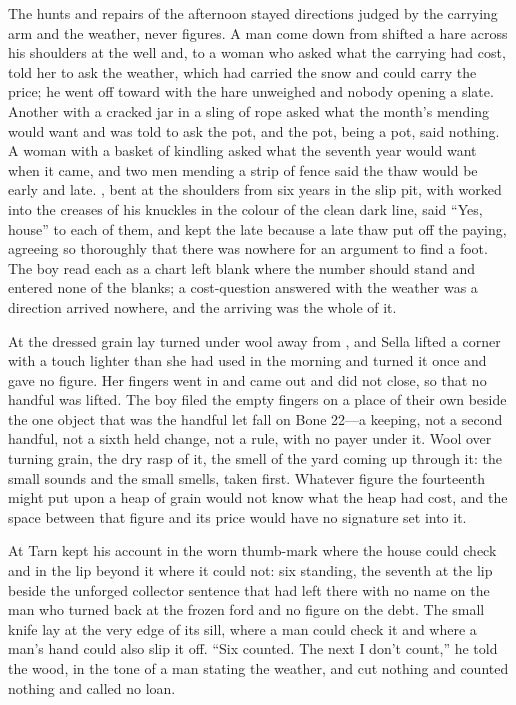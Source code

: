 The hunts and repairs of the afternoon stayed directions judged by the carrying arm and the weather, never figures. A man come down from  shifted a hare across his shoulders at the well and, to a woman who asked what the carrying had cost, told her to ask the weather, which had carried the snow and could carry the price; he went off toward  with the hare unweighed and nobody opening a slate. Another with a cracked jar in a sling of rope asked what the month's mending would want and was told to ask the pot, and the pot, being a pot, said nothing. A woman with a basket of kindling asked what the seventh year would want when it came, and two men mending a strip of fence said the thaw would be early and late. , bent at the shoulders from six years in the slip pit, with  worked into the creases of his knuckles in the colour of the clean dark line, said “Yes, house” to each of them, and kept the late because a late thaw put off the paying, agreeing so thoroughly that there was nowhere for an argument to find a foot. The boy read each as a chart left blank where the number should stand and entered none of the blanks; a cost-question answered with the weather was a direction arrived nowhere, and the arriving was the whole of it.

At  the dressed grain lay turned under wool away from , and Sella lifted a corner with a touch lighter than she had used in the morning and turned it once and gave no figure. Her fingers went in and came out and did not close, so that no handful was lifted. The boy filed the empty fingers on a place of their own beside the one object that was the handful let fall on Bone 22---a keeping, not a second handful, not a sixth held change, not a rule, with no payer under it. Wool over turning grain, the dry rasp of it, the smell of the yard coming up through it: the small sounds and the small smells, taken first. Whatever figure the fourteenth might put upon a heap of grain would not know what the heap had cost, and the space between that figure and its price would have no signature set into it.

\scenebreak

At  Tarn kept his account in the worn thumb-mark where the house could check and in the lip beyond it where it could not: six standing, the seventh at the lip beside the unforged collector sentence that  had left there with no name on the man who turned back at the frozen ford and no figure on the debt. The small knife lay at the very edge of its sill, where a man could check it and where a man's hand could also slip it off. “Six counted. The next I don't count,” he told the wood, in the tone of a man stating the weather, and cut nothing and counted nothing and called no loan.

